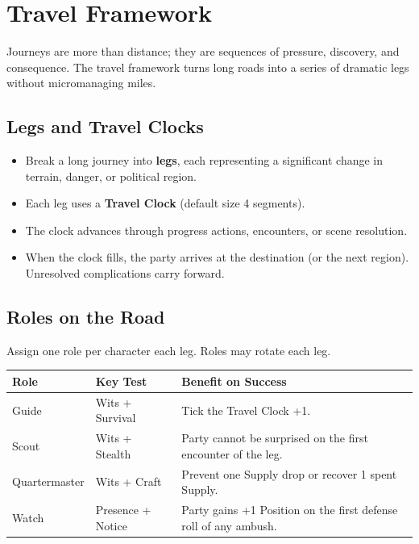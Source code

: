 
\section{Travel Framework}

Journeys are more than distance; they are sequences of pressure, discovery, and consequence. The travel framework turns long roads into a series of dramatic legs without micromanaging miles.

\subsection{Legs and Travel Clocks}

\begin{itemize}
  \item Break a long journey into \textbf{legs}, each representing a significant change in terrain, danger, or political region.
  \item Each leg uses a \textbf{Travel Clock} (default size 4 segments).
  \item The clock advances through progress actions, encounters, or scene resolution.
  \item When the clock fills, the party arrives at the destination (or the next region). Unresolved complications carry forward.
\end{itemize}

\subsection{Roles on the Road}

Assign one role per character each leg. Roles may rotate each leg.

\begin{tabular}{@{}lp{3cm}p{7cm}@{}}
\toprule
\textbf{Role} & \textbf{Key Test} & \textbf{Benefit on Success} \\
\midrule
Guide & Wits + Survival & Tick the Travel Clock +1. \\
Scout & Wits + Stealth & Party cannot be surprised on the first encounter of the leg. \\
Quartermaster & Wits + Craft & Prevent one Supply drop or recover 1 spent Supply. \\
Watch & Presence + Notice & Party gains +1 Position on the first defense roll of any ambush. \\
\bottomrule
\end{tabular}


